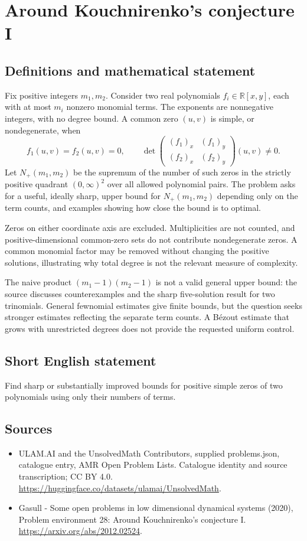 \documentclass[11pt,a4paper]{article}
\begin{document}
\section*{Around Kouchnirenko's conjecture I}\label{statement}

\subsection{Definitions and mathematical statement}
Fix positive integers $m_1,m_2$. Consider two real polynomials
$f_i\in\mathbb R[x,y]$, each with at most $m_i$ nonzero monomial terms.
The exponents are nonnegative integers, with no degree bound. A common
zero $(u,v)$ is simple, or nondegenerate, when
\[
 f_1(u,v)=f_2(u,v)=0,\qquad
 \det\begin{pmatrix}(f_1)_x&(f_1)_y\\(f_2)_x&(f_2)_y\end{pmatrix}(u,v)\ne0.
\]
Let $N_+(m_1,m_2)$ be the supremum of the number of such zeros in the
strictly positive quadrant $(0,\infty)^2$ over all allowed polynomial pairs.
The problem asks for a useful, ideally sharp, upper bound for
$N_+(m_1,m_2)$ depending only on the term counts, and examples showing how
close the bound is to optimal.

Zeros on either coordinate axis are excluded. Multiplicities are not
counted, and positive-dimensional common-zero sets do not contribute
nondegenerate zeros. A common monomial factor may be removed without
changing the positive solutions, illustrating why total degree is not
the relevant measure of complexity.

The naive product $(m_1-1)(m_2-1)$ is not a valid general upper bound:
the source discusses counterexamples and the sharp five-solution result
for two trinomials. General fewnomial estimates give finite bounds, but
the question seeks stronger estimates reflecting the separate term
counts. A Bézout estimate that grows with unrestricted degrees does not
provide the requested uniform control.
\subsection{Short English statement}
Find sharp or substantially improved bounds for positive simple zeros of two polynomials using only their numbers of terms.
\subsection{Sources}
\begin{itemize}
\item[S1] ULAM.AI and the UnsolvedMath Contributors, supplied problems.json, catalogue entry, AMR Open Problem Lists. Catalogue identity and source transcription; CC BY 4.0.
\url{https://huggingface.co/datasets/ulamai/UnsolvedMath}.
\item[S2] Gasull - Some open problems in low dimensional dynamical systems (2020), Problem environment 28: Around Kouchnirenko's conjecture I. 
\url{https://arxiv.org/abs/2012.02524}.
\end{itemize}
\end{document}
